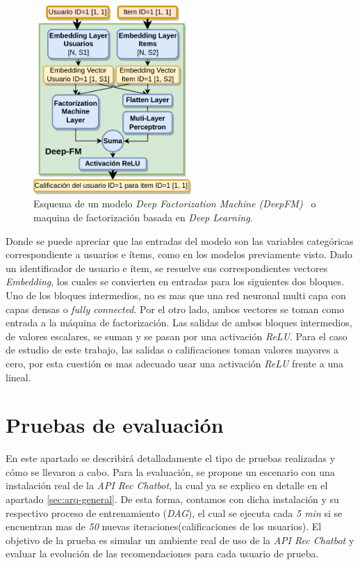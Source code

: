 \documentclass[11pt,a4paper,twoside]{thesis}
\begin{document}
\begin{figure}[h!]
	\centering
	\includegraphics[width=6cm]{./images/Deep-MF.png}
	\caption{
		Esquema de un modelo \textit{Deep Factorization Machine (DeepFM)~\cite{dfmpaper, didldfm}} o maquina
		de factorización basada en \textit{Deep Learning}.
	}
	\label{fig:DeepMFModel}
\end{figure}

Donde se puede apreciar que las entradas del modelo son las variables
categóricas correspondiente a usuarios e ítems, como en los modelos previamente
visto. Dado un identificador de usuario e ítem, se resuelve sus correspondientes
vectores \textit{Embedding}, los cuales se convierten en entradas para los
siguientes dos bloques. Uno de los bloques intermedios, no es mas que una red
neuronal multi capa con capas densas o \textit{fully connected}. Por el otro
lado, ambos vectores se toman como entrada a la máquina de factorización. Las
salidas de ambos bloques intermedios, de valores escalares, se suman y se pasan
por una activación \textit{ReLU}. Para el caso de estudio de este trabajo, las
salidas o calificaciones toman valores mayores a cero, por esta cuestión es mas
adecuado usar una activación \textit{ReLU} frente a una lineal.


\chapter{Pruebas de evaluación}

En este apartado se describirá detalladamente el tipo de pruebas realizadas y cómo se llevaron a cabo. Para la evaluación, se propone un escenario con una instalación real de la \textit{API Rec Chatbot}, la cual ya se explico en detalle en el apartado \ref{sec:arq-general}. De esta forma, contamos con dicha instalación y su respectivo proceso de entrenamiento (\textit{DAG}), el cual se ejecuta cada \textit{5 min} si se encuentran mas de \textit{50} nuevas iteraciones(calificaciones de los usuarios). El objetivo de la prueba es simular un ambiente real de uso de la \textit{API Rec Chatbot} y evaluar la evolución de las recomendaciones para cada usuario de prueba.
\end{document}
